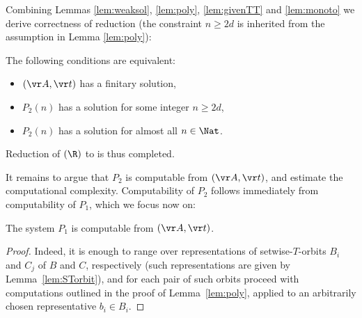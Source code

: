 Combining Lemmas \ref{lem:weaksol}, \ref{lem:poly}, \ref{lem:givenTT} and \ref{lem:monoto}
we derive correctness of reduction
(the constraint $n\geq 2d$ is inherited from the assumption in Lemma \ref{lem:poly}):
%
\begin{corollary} \label{cor:iff}
The following conditions are equivalent:
\begin{itemize}
\item
$(\vr A, \vr t)$ has a finitary solution,
\item
$P_2(n)$ has a solution for some integer $n \geq 2d$,
\item
$P_2(n)$ has a solution for almost all $n \in \Nat$.
\end{itemize}
\end{corollary}
%
%
%
%
%

Reduction of \finineqsolvname$(\R)$ to \allpolyineqsolvname is thus completed.

It remains to argue that $P_2$ is computable from $(\vr A, \vr t)$, and estimate the 
computational complexity.
Computability of $P_2$ follows immediately from computability of $P_1$, which we focus now on:
%
\begin{lemma} \label{lem:comp}
The system $P_1$ is computable from $(\vr A, \vr t)$. %
\end{lemma}
\begin{proof}
Indeed, it is enough to range over representations of setwise-$T$-orbits $B_i$ and $C_j$ of $B$ and $C$, respectively
(such representations are given by Lemma~\ref{lem:STorbit}), and for each
pair of such orbits proceed with computations outlined in the proof of Lemma~\ref{lem:poly}, applied
to an arbitrarily chosen representative $b_i\in B_i$. 
\end{proof}

